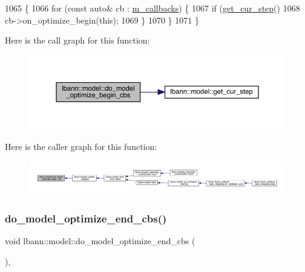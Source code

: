 \begin{DoxyCode}
1065                                         \{
1066   \textcolor{keywordflow}{for} (\textcolor{keyword}{const} \textcolor{keyword}{auto}& cb : \hyperlink{classlbann_1_1model_a07b511fef30368494c2ad80922ffd0eb}{m\_callbacks}) \{
1067     \textcolor{keywordflow}{if} (\hyperlink{classlbann_1_1model_ad0cdcba177434b52dc9c4a97be183a92}{get\_cur\_step}() %
1068       cb->on\_optimize\_begin(\textcolor{keyword}{this});
1069     \}
1070   \}
1071 \}
\end{DoxyCode}
Here is the call graph for this function\+:\nopagebreak
\begin{figure}[H]
\begin{center}
\leavevmode
\includegraphics[width=350pt]{classlbann_1_1model_a19c96544ccf733646f3454be887f3a08_cgraph}
\end{center}
\end{figure}
Here is the caller graph for this function\+:\nopagebreak
\begin{figure}[H]
\begin{center}
\leavevmode
\includegraphics[width=350pt]{classlbann_1_1model_a19c96544ccf733646f3454be887f3a08_icgraph}
\end{center}
\end{figure}
\mbox{\label{classlbann_1_1model_ac0b37e4f4881e274bd9c4889d4852fe8}} 
\subsubsection{\texorpdfstring{do\+\_\+model\+\_\+optimize\+\_\+end\+\_\+cbs()}{do\_model\_optimize\_end\_cbs()}}
{\footnotesize\ttfamily void lbann\+::model\+::do\+\_\+model\+\_\+optimize\+\_\+end\+\_\+cbs (\begin{DoxyParamCaption}{ }\end{DoxyParamCaption})\hspace{0.3cm}{\ttfamily [protected]}, {\ttfamily [virtual]}}

